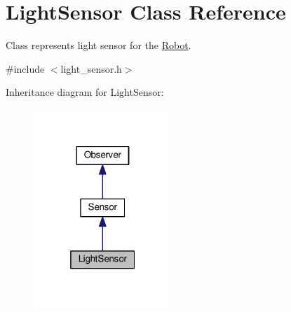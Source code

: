 \hypertarget{classLightSensor}{}\section{Light\+Sensor Class Reference}
\label{classLightSensor}


Class represents light sensor for the \hyperlink{classRobot}{Robot}.  




{\ttfamily \#include $<$light\+\_\+sensor.\+h$>$}



Inheritance diagram for Light\+Sensor\+:\nopagebreak
\begin{figure}[H]
\begin{center}
\leavevmode
\includegraphics[width=148pt]{classLightSensor__inherit__graph}
\end{center}
\end{figure}


